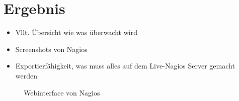 \section{Ergebnis}

\begin{itemize}
\item Vllt. Übersicht wie was überwacht wird
\item Screenshots von Nagios
\item Exportierfähigkeit, was muss alles auf dem Live-Nagios Server gemacht werden
\end{itemize}

\begin{figure}[ht]
	\centering
		\caption{Webinterface von Nagios}
		\label{user-sim}
\end{figure}